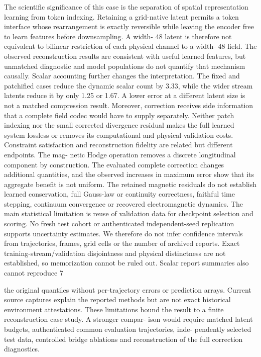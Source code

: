\documentclass[11pt]{article}
\begin{document}
The scientific significance of this case is the separation of spatial representation learning from
token indexing. Retaining a grid-native latent permits a token interface whose rearrangement is
exactly reversible while leaving the encoder free to learn features before downsampling. A width- 48
latent is therefore not equivalent to bilinear restriction of each physical channel to a width- 48 field.
The observed reconstruction results are consistent with useful learned features, but unmatched
diagnostic and model populations do not quantify that mechanism causally.
Scalar accounting further changes the interpretation. The fixed and patchified cases reduce the
dynamic scalar count by 3.33, while the wider stream latents reduce it by only 1.25 or 1.67. A
lower error at a different latent size is not a matched compression result. Moreover, correction
receives side information that a complete field codec would have to supply separately. Neither
patch indexing nor the small corrected divergence residual makes the full learned system lossless
or removes its computational and physical-validation costs.
Constraint satisfaction and reconstruction fidelity are related but different endpoints. The mag-
netic Hodge operation removes a discrete longitudinal component by construction. The evaluated
complete correction changes additional quantities, and the observed increases in maximum error
show that its aggregate benefit is not uniform. The retained magnetic residuals do not establish
learned conservation, full Gauss-law or continuity correctness, faithful time stepping, continuum
convergence or recovered electromagnetic dynamics.
The main statistical limitation is reuse of validation data for checkpoint selection and scoring.
No fresh test cohort or authenticated independent-seed replication supports uncertainty estimates.
We therefore do not infer confidence intervals from trajectories, frames, grid cells or the number of
archived reports. Exact training-stream/validation disjointness and physical distinctness are not
established, so memorization cannot be ruled out. Scalar report summaries also cannot reproduce
7

the original quantiles without per-trajectory errors or prediction arrays. Current source captures
explain the reported methods but are not exact historical environment attestations.
These limitations bound the result to a finite reconstruction case study. A stronger compar-
ison would require matched latent budgets, authenticated common evaluation trajectories, inde-
pendently selected test data, controlled bridge ablations and reconstruction of the full correction
diagnostics.
\end{document}
